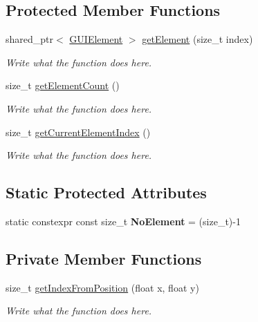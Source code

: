 \subsection*{Protected Member Functions}
\begin{DoxyCompactItemize}
\item 
shared\+\_\+ptr$<$ \hyperlink{classGUIElement}{G\+U\+I\+Element} $>$ \hyperlink{classGUIContainer_aa284afbbc302222ac9bff04fba9bfe4e}{get\+Element} (size\+\_\+t index)
\begin{DoxyCompactList}\small\item\em Write what the function does here. \end{DoxyCompactList}\item 
size\+\_\+t \hyperlink{classGUIContainer_a65c0f2e73c3f02ea936cb37447dba04b}{get\+Element\+Count} ()
\begin{DoxyCompactList}\small\item\em Write what the function does here. \end{DoxyCompactList}\item 
size\+\_\+t \hyperlink{classGUIContainer_a2e29a0e330951f3dd35b7b81c39b5a65}{get\+Current\+Element\+Index} ()
\begin{DoxyCompactList}\small\item\em Write what the function does here. \end{DoxyCompactList}\end{DoxyCompactItemize}
\subsection*{Static Protected Attributes}
\begin{DoxyCompactItemize}
\item 
\hypertarget{classGUIContainer_a530b15ff8ab84f7a4357b5714da3c16b}{static constexpr const size\+\_\+t {\bfseries No\+Element} = (size\+\_\+t)-\/1}\label{classGUIContainer_a530b15ff8ab84f7a4357b5714da3c16b}

\end{DoxyCompactItemize}
\subsection*{Private Member Functions}
\begin{DoxyCompactItemize}
\item 
size\+\_\+t \hyperlink{classGUIContainer_a99d8776d71b5452a138842d3d2822348}{get\+Index\+From\+Position} (float x, float y)
\begin{DoxyCompactList}\small\item\em Write what the function does here. \end{DoxyCompactList}\end{DoxyCompactItemize}
